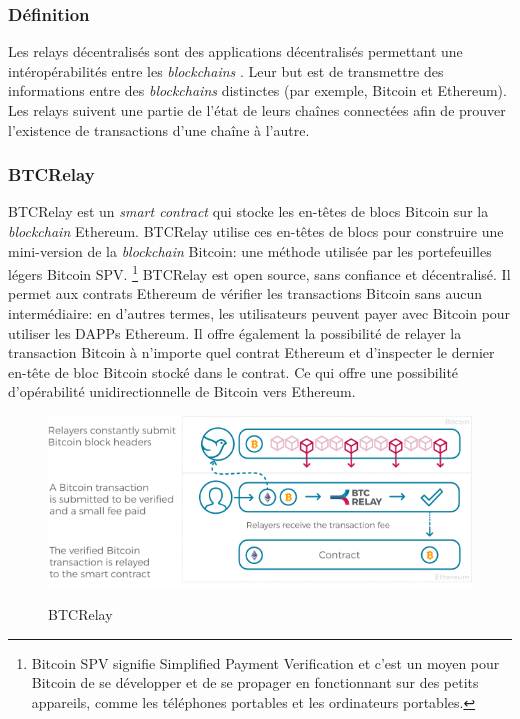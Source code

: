 \subsubsection{Définition}
Les relays décentralisés sont des applications décentralisés permettant une intéropérabilités entre les \textit{\gls{blockchain}s} \cite{qin2018overview, westerkamp2022verilay,belchior2022survey}.
Leur but est de transmettre des informations entre des \textit{\gls{blockchain}s} distinctes (par exemple, Bitcoin et Ethereum). 
Les relays suivent une partie de l’état de leurs chaînes connectées afin de prouver l’existence de transactions d’une chaîne à l’autre.

\subsubsection{BTCRelay}
BTCRelay est un \textit{smart contract} qui stocke les en-têtes de blocs Bitcoin sur la \textit{\gls{blockchain}} Ethereum. \cite{qin2018overview,belchior2022survey,btcrelay2022web,btcrelay2022git}
BTCRelay utilise ces en-têtes de blocs pour construire une mini-version de la \textit{\gls{blockchain}} Bitcoin: une méthode utilisée par les 
portefeuilles légers Bitcoin SPV. \footnote{Bitcoin SPV signifie Simplified Payment Verification et c’est un moyen pour Bitcoin de se 
développer et de se propager en fonctionnant sur des petits appareils, comme les téléphones portables et les ordinateurs portables.}
BTCRelay est open source, sans confiance et décentralisé. Il permet aux contrats Ethereum de vérifier les transactions Bitcoin sans aucun 
intermédiaire: en d’autres termes, les utilisateurs peuvent payer avec Bitcoin pour utiliser les DAPPs Ethereum. Il offre également la 
possibilité de relayer la transaction Bitcoin à n’importe quel contrat Ethereum et d’inspecter le dernier en-tête de bloc Bitcoin stocké 
dans le contrat. Ce qui offre une possibilité d'opérabilité unidirectionnelle de Bitcoin vers Ethereum.\\

\begin{figure}[h!]
  \centering
  \includegraphics[scale=0.5]{decentralisation/btcRelay.png}
  \label{fig:btcRelay}
  \caption{BTCRelay}
\end{figure}

